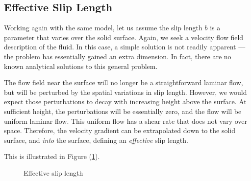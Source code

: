 \documentclass[12pt, a4paper, twoside, openright]{book}
\begin{document}
\clearpage
\subsection*{Effective Slip Length}

Working again with the same model, let us assume the slip length $b$ is a parameter that varies over the solid surface. Again, we seek a velocity flow field description of the fluid. In this case, a simple solution is not readily apparent --- the problem has essentially gained an extra dimension. In fact, there are no known analytical solutions to this general problem.

The flow field near the surface will no longer be a straightforward laminar flow, but will be perturbed by the spatial variations in slip length. However, we would expect those perturbations to decay with increasing height above the surface. At sufficient height, the perturbations will be essentially zero, and the flow will be uniform laminar flow. This uniform flow has a shear rate that does not vary over space.  Therefore, the velocity gradient can be extrapolated down to the solid surface, and \emph{into} the surface, defining an \emph{effective} slip length.

This is illustrated in Figure (\ref{effslip}).

\begin{figure}[ht]
\centering
{}
\caption{Effective slip length} \label{effslip} 
\end{figure}
\end{document}
